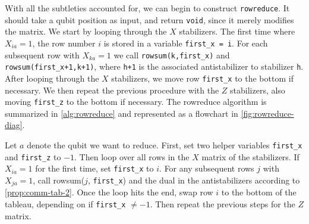 With all the subtleties accounted for, we can begin to construct
\verb|rowreduce|. It should take a qubit position as input, and return
\verb|void|, since it merely modifies the matrix. We start by looping through
the $X$ stabilizers. The first time where $X_{ia}=1$, the row number $i$ is
stored in a variable \verb|first_x = i|. For each subsequent row with $X_{ka}=1$
we call \verb|rowsum(k,first_x)| and \verb|rowsum(first_x+1,k+1)|, where
\verb|h+1| is the associated antistabilizer to stabilizer \verb|h|. After
looping through the $X$ stabilizers, we move row \verb|first_x| to the bottom
if necessary. We then repeat the previous procedure with the $Z$ stabilizers,
also moving \verb|first_z| to the bottom if necessary. 
The rowreduce algorithm is summarized in \cref{alg:rowreduce} and represented
as a flowchart in \cref{fig:rowreduce-diag}.
\begin{alg}[Rowreduce]\label{alg:rowreduce}
  Let $a$ denote the qubit we want to reduce. First, set two helper variables
  \verb|first_x| and \verb|first_z| to $-1$. Then loop over all rows in the $X$
  matrix of the stabilizers. If $X_{ia} = 1$ for the first time, set
  \verb|first_x| to $i$. For any subsequent rows $j$ with $X_{ja} = 1$, call
  rowsum($j$, \verb|first_x|) and the dual in the antistabilizers according to
  \cref{prop:comm-tab-2}. Once the loop hits the end, swap row $i$ to the
  bottom of the tableau, depending on if \verb|first_x| $\neq-1$. Then repeat
  the previous steps for the $Z$ matrix.
\end{alg}

